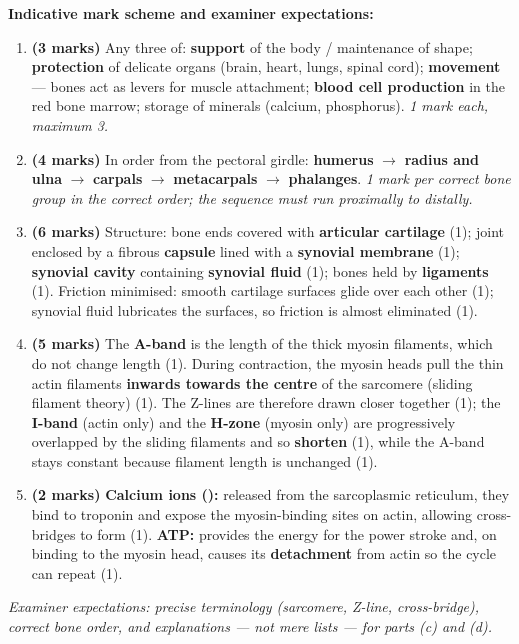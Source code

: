 \documentclass[11pt]{article}
\begin{document}
\begin{corrige}
\textbf{Indicative mark scheme and examiner expectations:}
\begin{enumerate}
\item \textbf{(3 marks)} Any three of: \textbf{support} of the body / maintenance of shape; \textbf{protection} of delicate organs (brain, heart, lungs, spinal cord); \textbf{movement} — bones act as levers for muscle attachment; \textbf{blood cell production} in the red bone marrow; storage of minerals (calcium, phosphorus). \emph{1 mark each, maximum 3.}
\item \textbf{(4 marks)} In order from the pectoral girdle: \textbf{humerus} $\rightarrow$ \textbf{radius and ulna} $\rightarrow$ \textbf{carpals} $\rightarrow$ \textbf{metacarpals} $\rightarrow$ \textbf{phalanges}. \emph{1 mark per correct bone group in the correct order; the sequence must run proximally to distally.}
\item \textbf{(6 marks)} Structure: bone ends covered with \textbf{articular cartilage} (1); joint enclosed by a fibrous \textbf{capsule} lined with a \textbf{synovial membrane} (1); \textbf{synovial cavity} containing \textbf{synovial fluid} (1); bones held by \textbf{ligaments} (1). Friction minimised: smooth cartilage surfaces glide over each other (1); synovial fluid lubricates the surfaces, so friction is almost eliminated (1).
\item \textbf{(5 marks)} The \textbf{A-band} is the length of the thick myosin filaments, which do not change length (1). During contraction, the myosin heads pull the thin actin filaments \textbf{inwards towards the centre} of the sarcomere (sliding filament theory) (1). The Z-lines are therefore drawn closer together (1); the \textbf{I-band} (actin only) and the \textbf{H-zone} (myosin only) are progressively overlapped by the sliding filaments and so \textbf{shorten} (1), while the A-band stays constant because filament length is unchanged (1).
\item \textbf{(2 marks)} \textbf{Calcium ions ():} released from the sarcoplasmic reticulum, they bind to troponin and expose the myosin-binding sites on actin, allowing cross-bridges to form (1). \textbf{ATP:} provides the energy for the power stroke and, on binding to the myosin head, causes its \textbf{detachment} from actin so the cycle can repeat (1).
\end{enumerate}
\emph{Examiner expectations: precise terminology (sarcomere, Z-line, cross-bridge), correct bone order, and explanations — not mere lists — for parts (c) and (d).}
\end{corrige}
\end{document}
